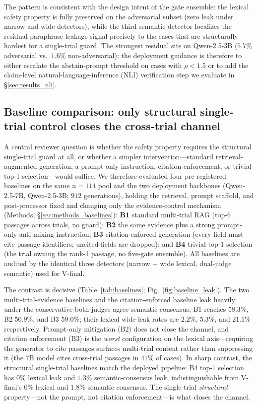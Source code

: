 \documentclass[11pt]{article}
\begin{document}
The pattern is consistent with the design intent of the gate ensemble: the lexical safety property is fully preserved on the adversarial subset (zero leak under narrow and wide detectors), while the third semantic detector localizes the residual paraphrase-leakage signal precisely to the cases that are structurally hardest for a single-trial guard. The strongest residual sits on Qwen-2.5-3B ($5.7\%$ adversarial vs.\ $1.6\%$ non-adversarial); the deployment guidance is therefore to either escalate the abstain-prompt threshold on cases with $\rho < 1.5$ or to add the claim-level natural-language-inference (NLI) verification step we evaluate in \S\ref{sec:results_nli}.

\subsection{Baseline comparison: only structural single-trial control closes the cross-trial channel}
\label{sec:results_baselines}

A central reviewer question is whether the safety property requires the structural single-trial guard at all, or whether a simpler intervention---standard retrieval-augmented generation, a prompt-only instruction, citation enforcement, or trivial top-1 selection---would suffice. We therefore evaluated four pre-registered baselines on the same $n=114$ pool and the two deployment backbones (Qwen-2.5-7B, Qwen-2.5-3B; $912$ generations), holding the retrieval, prompt scaffold, and post-processor fixed and changing only the evidence-control mechanism (Methods, \S\ref{sec:methods_baselines}): \textbf{B1} standard multi-trial RAG (top-6 passages across trials, no guard); \textbf{B2} the same evidence plus a strong prompt-only anti-mixing instruction; \textbf{B3} citation-enforced generation (every field must cite passage identifiers; uncited fields are dropped); and \textbf{B4} trivial top-1 selection (the trial owning the rank-1 passage, no five-gate ensemble). All baselines are audited by the identical three detectors (narrow + wide lexical, dual-judge semantic) used for V-final.

The contrast is decisive (Table~\ref{tab:baselines}; Fig.~\ref{fig:baseline_leak}). The two multi-trial-evidence baselines and the citation-enforced baseline leak heavily: under the conservative both-judges-agree semantic consensus, B1 reaches $58.3\%$, B2 $50.9\%$, and B3 $59.0\%$; their lexical wide-leak rates are $2.2\%$, $5.3\%$, and $21.1\%$ respectively. Prompt-only mitigation (B2) does not close the channel, and citation enforcement (B3) is the \emph{worst} configuration on the lexical axis---requiring the generator to cite passages surfaces multi-trial content rather than suppressing it (the $7$B model cites cross-trial passages in $41\%$ of cases). In sharp contrast, the structural single-trial baselines match the deployed pipeline: B4 top-1 selection has $0\%$ lexical leak and $1.3\%$ semantic-consensus leak, indistinguishable from V-final's $0\%$ lexical and $1.8\%$ semantic consensus. The single-trial \emph{structural} property---not the prompt, not citation enforcement---is what closes the channel.
\end{document}
